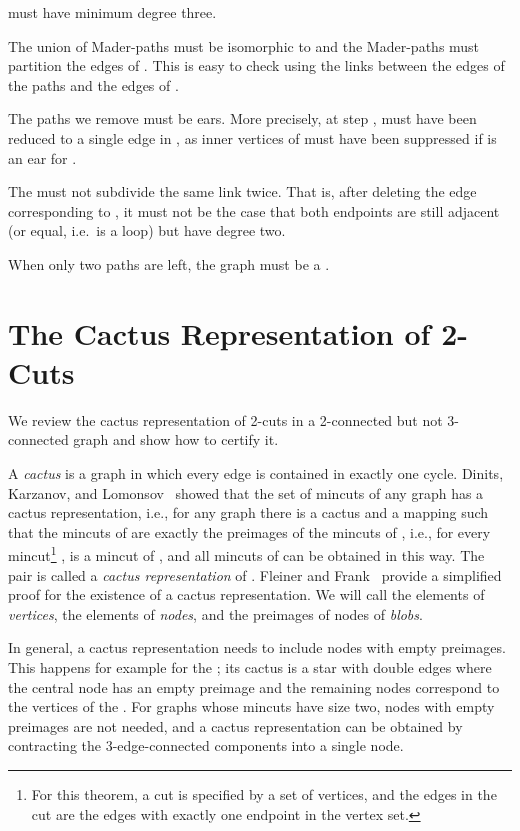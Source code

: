 \documentclass[paper=a4]{scrartcl}
\begin{document}
\begin{compactitem}
\item  must have minimum degree three.
\item The union of Mader-paths must be isomorphic to  and the Mader-paths must partition the edges of . This is easy to check using the links between the edges of the paths and the edges of .
\item The paths we remove must be ears. More precisely, at step ,  must have been reduced to a single edge in , as inner vertices of  must have been suppressed if  is an ear for .
\item The  must not subdivide the same link twice. That is, after deleting the edge corresponding to , it must not be the case that both endpoints are still adjacent (or equal, i.e.\  is a loop) but have degree two.
\item When only two paths are left, the graph must be a .
\end{compactitem}




\section{The Cactus Representation of 2-Cuts}\label{Sec: Cactus Representation}
We review the cactus representation of 2-cuts in a 2-connected but not 3-connected graph and show how to certify it.

A \emph{cactus} is a graph in which every edge is contained in exactly one cycle. Dinits, Karzanov, and Lomonsov~\cite{Dinits-Karzanov-Lomonosov} showed that the set of mincuts of any graph has a cactus representation, i.e., for any graph  there is a cactus  and a mapping  such that the mincuts of  are exactly the preimages of the mincuts of , i.e., for every mincut\footnote{For this theorem, a cut is specified by a set of vertices, and the edges in the cut are the edges with exactly one endpoint in the vertex set.} ,  is a mincut of , and all mincuts of  can be obtained in this way. The pair  is called a \emph{cactus representation} of . Fleiner and Frank~\cite{Fleiner2009} provide a simplified proof for the existence of a cactus representation. We will call the elements of  \emph{vertices}, the elements of  \emph{nodes}, and the preimages of nodes of  \emph{blobs}.

In general, a cactus representation needs to include nodes with empty preimages. This happens for example for the ; its cactus is a star with double edges where the central node has an empty preimage and the remaining nodes correspond to the vertices of the . For graphs whose mincuts have size two, nodes with empty preimages are not needed, and a cactus representation can be obtained by contracting the 3-edge-connected components into a single node. 
\end{document}
